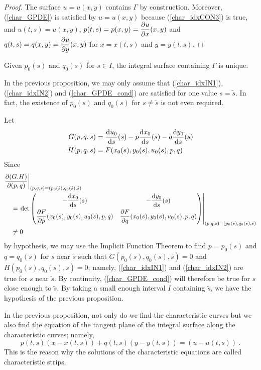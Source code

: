\begin{proof}
 The surface $u=u(x,y)$ contains $\Gamma$ by construction.
Moreover, (\ref{char_GPDE}) is satisfied by $u=u(x,y)$ because
(\ref{char_idxCON3}) is true, and
$u(t,s) = u(x,y)$, $\displaystyle p(t,s) = p(x,y) = \frac{\partial{u}}{\partial x}(x,y)$
and $\displaystyle q(t,s) = q(x,y) = \frac{\partial{u}}{\partial y}(x,y)$
for $x=x(t,s)$ and $y=y(t,s)$.
\end{proof}

\begin{rmk}
Given $p_0(s)$ and $q_0(s)$ for $s\in I$, the integral surface
containing $\Gamma$ is unique.
\end{rmk}

\begin{rmk}
In the previous proposition, we may only assume that     \label{char_PQCON}
(\ref{char_idxIN1}), (\ref{char_idxIN2}) and (\ref{char_GPDE_cond})
are satisfied for one value $s=\tilde{s}$.  In fact, the existence of $p_0(s)$
and $q_0(s)$ for $s\neq \tilde{s}$ is not even required.

Let
\begin{align*}
G(p,q,s) &= \frac{\mathrm{d}u_0}{\mathrm{d}{s}}(s) - p \frac{\mathrm{d}x_0}{\mathrm{d}{s}}(s) - q \frac{\mathrm{d}y_0}{\mathrm{d}{s}}(s) \\
H(p,q,s) &= F(x_0(s),y_0(s),u_0(s),p,q)
\end{align*}
Since
\begin{align*}
& \frac{\partial(G.H)}{\partial(p,q)}
\bigg|_{(p,q,s)=(p_0(\tilde{s}),q_0(\tilde{s}),\tilde{s})} \\
&\quad = \left. \det
\begin{pmatrix}
\displaystyle -\frac{\mathrm{d}x_0}{\mathrm{d}{s}}(s) &
\displaystyle -\frac{\mathrm{d}y_0}{\mathrm{d}{s}}(s) \\[0.7em]
\displaystyle \frac{\partial{F}}{\partial p}(x_0(s),y_0(s),u_0(s),p,q) &
\displaystyle \frac{\partial{F}}{\partial q}(x_0(s),y_0(s),u_0(s),p,q) \\
\end{pmatrix} \right|_{(p,q,s)=(p_0(\tilde{s}),q_0(\tilde{s}),\tilde{s})}\\
&\quad \neq 0
\end{align*}
by hypothesis, we may use the Implicit Function
Theorem to find $p=p_0(s)$ and $q=q_0(s)$ for $s$ near $\tilde{s}$ such that
$G(p_0(s), q_0(s),s) = 0$ and $H(p_0(s),q_0(s),s)=0$; namely,
(\ref{char_idxIN1}) and (\ref{char_idxIN2}) are true for $s$ near $\tilde{s}$.
By continuity, (\ref{char_GPDE_cond}) will therefore be true for $s$
close enough to $\tilde{s}$.  By taking a small enough interval $I$
containing $\tilde{s}$, we have the hypothesis of the previous proposition.
\end{rmk}

\begin{rmk}
In the previous proposition, not only do we find the characteristic
curves but we also find the equation of the tangent plane of the
integral surface along the characteristic curves; namely,
\[
p(t,s)(x-x(t,s)) + q(t,s)(y-y(t,s)) = (u - u(t,s)) \ .
\]
This is the reason why the solutions of the characteristic equations
are called characteristic strips.
\end{rmk}

